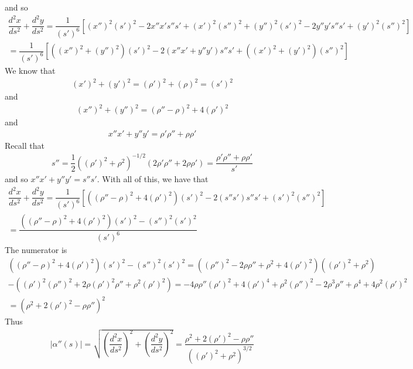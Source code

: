 \documentclass{article}
\begin{document}
	and so
	\begin{gather*}
		\dfrac{d^2x}{ds^2} + \dfrac{d^2y}{ds^2} = \dfrac{1}{(s')^6} \left[ (x'')^2(s')^2 - 2x'' x's''s' + (x')^2(s'')^2 + (y'')^2(s')^2 - 2y'' y's''s' + (y')^2(s'')^2  \right] \\
		= \dfrac{1}{(s')^6} \left[ \left( (x'')^2 + (y'')^2 \right)(s')^2 - 2(x'' x' + y''y')s''s' + \left( (x')^2 + (y')^2 \right)(s'')^2 \right]
	\end{gather*}
	We know that
	\begin{gather*}
		(x')^2 + (y')^2 = (\rho')^2 + (\rho)^2 = (s')^2
	\end{gather*}
	and
	\begin{gather*}
		(x'')^2 + (y'')^2 = (\rho'' - \rho)^2 + 4(\rho')^2
	\end{gather*}
	and
	\begin{gather*}
		x''x' + y''y' = \rho'\rho'' + \rho\rho'
	\end{gather*}
	Recall that
	\begin{gather*}
		s'' = \dfrac{1}{2} \left( (\rho')^2 + \rho^2 \right)^{-1/2} \left( 2 \rho'\rho'' + 2 \rho \rho' \right) = \dfrac{\rho'\rho'' + \rho\rho'}{s'}
	\end{gather*}
	and so $x''x' + y''y' = s''s'$. With all of this, we have that
	\begin{gather*}
		\dfrac{d^2x}{ds^2} + \dfrac{d^2y}{ds^2} = \dfrac{1}{(s')^6} \left[ \left( (\rho'' - \rho)^2 + 4(\rho')^2 \right)(s')^2 - 2(s''s')s''s' + (s')^2(s'')^2 \right] \\
		= \dfrac{\left( (\rho'' - \rho)^2 + 4(\rho')^2 \right)(s')^2 - (s'')^2(s')^2}{(s')^6}
	\end{gather*}
	The numerator is
	\begin{gather*}
		\left( (\rho'' - \rho)^2 + 4(\rho')^2 \right)(s')^2 - (s'')^2(s')^2 = \left( (\rho'')^2 - 2\rho\rho'' + \rho^2 + 4(\rho')^2 \right) \left( (\rho')^2 + \rho^2 \right) \\
		- \left( (\rho')^2(\rho'')^2 + 2\rho(\rho')^2\rho'' + \rho^2(\rho')^2 \right)
		= -4 \rho \rho'' (\rho')^2 + 4 (\rho')^4 + \rho^2 (\rho'')^2 - 2 \rho^3 \rho'' + \rho^4 + 4 \rho^2(\rho')^2 \\
		= (\rho^2 + 2(\rho')^2 - \rho\rho'')^2
	\end{gather*}
	Thus
	\begin{gather*}
		\left| \alpha''(s) \right| = \sqrt{ \left( \dfrac{d^2x}{ds^2} \right)^2 + \left( \dfrac{d^2y}{ds^2} \right)^2 } = \dfrac{ \rho^2 + 2(\rho')^2 - \rho\rho'' }{ \left( (\rho')^2 + \rho^2 \right)^{3/2} }
	\end{gather*}
\end{document}
